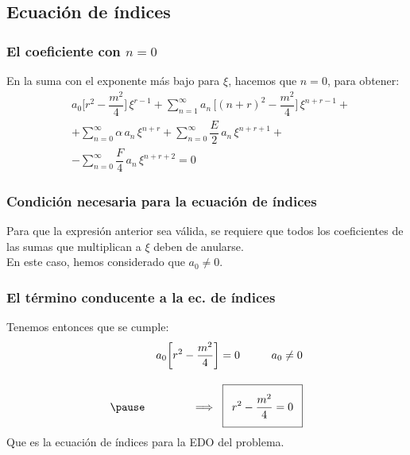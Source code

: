 \documentclass[12pt]{beamer}
\begin{document}
\subsection{Ecuación de índices}

\begin{frame}
\frametitle{El coeficiente con $n=0$}
En la suma con el exponente más bajo para $\xi$, hacemos que $n = 0$, para obtener:
\pause
\begin{align*}
&{} a_{0} \bigg[ r^{2} {-} \dfrac{m^{2}}{4} \bigg] \, \xi^{r-1} + \sum_{n=1}^{\infty} a_{n} \, \bigg[ (n {+} r)^{2} {-} \dfrac{m^{2}}{4} \bigg] \, \xi^{n+r-1} + \\[1em] 
&+  \sum_{n=0}^{\infty} \alpha \, a_{n} \, \xi^{n+r} + \sum_{n=0}^{\infty} \dfrac{E}{2} \, a_{n} \, \xi^{n+r+1} + \\[1em]
&- \sum_{n=0}^{\infty} \dfrac{F}{4} \, a_{n} \, \xi^{n+r+2} = 0
\end{align*}    
\end{frame}
\begin{frame}
\frametitle{Condición necesaria para la ecuación de índices}
Para que la expresión anterior sea válida, se requiere que todos los coeficientes de las sumas que multiplican a $\xi$ deben de anularse.
\\
\bigskip
\pause
En este caso, hemos considerado que $a_{0} \neq 0$.
\end{frame}
\begin{frame}
\frametitle{El término conducente a la ec. de índices}
Tenemos entonces que se cumple:
\pause
\begin{eqnarray*}
&{}& a_{0} \bigg[ r^{2} - \dfrac{m^{2}}{4} \bigg] = 0 \hspace{1cm} a_{0} \neq 0 \\[1em] \pause
&{}& \Longrightarrow \hspace{0.2cm} \addtolength{\fboxsep}{5pt}\boxed{ r^{2} - \dfrac{m^{2}}{4} = 0}
\end{eqnarray*}
Que es la ecuación de índices para la EDO del problema.
\end{frame}
\end{document}
